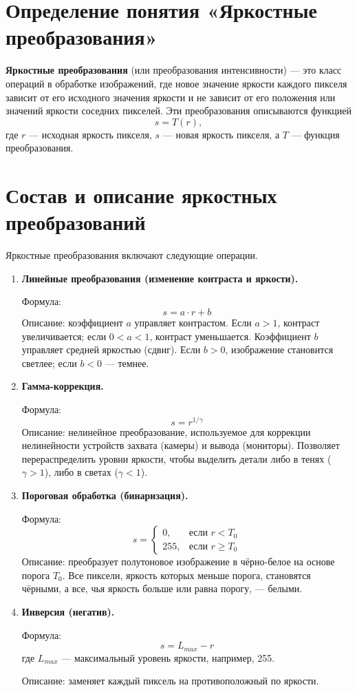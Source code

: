 \documentclass[12pt,a4paper]{article}
\begin{document}
\section{Определение понятия «Яркостные преобразования»}

\textbf{Яркостные преобразования} (или преобразования интенсивности) --- это класс операций в обработке изображений, где новое значение яркости каждого пикселя зависит от его исходного значения яркости и не зависит от его положения или значений яркости соседних пикселей. Эти преобразования описываются функцией
\[
s = T(r),
\]
где \(r\) --- исходная яркость пикселя, \(s\) --- новая яркость пикселя, а \(T\) --- функция преобразования.

\section{Состав и описание яркостных преобразований}

Яркостные преобразования включают следующие операции.

\begin{enumerate}
    \item \textbf{Линейные преобразования (изменение контраста и яркости).}

    Формула:
    \[
    s = a \cdot r + b
    \]
    Описание: коэффициент \(a\) управляет контрастом. Если \(a > 1\), контраст увеличивается; если \(0 < a < 1\), контраст уменьшается. Коэффициент \(b\) управляет средней яркостью (сдвиг). Если \(b > 0\), изображение становится светлее; если \(b < 0\) --- темнее.

    \item \textbf{Гамма-коррекция.}

    Формула:
    \[
    s = r^{1/\gamma}
    \]
    Описание: нелинейное преобразование, используемое для коррекции нелинейности устройств захвата (камеры) и вывода (мониторы). Позволяет перераспределить уровни яркости, чтобы выделить детали либо в тенях (\(\gamma > 1\)), либо в светах (\(\gamma < 1\)).

    \item \textbf{Пороговая обработка (бинаризация).}

    Формула:
    \[
    s = \begin{cases}
    0, & \text{если } r < T_0 \\
    255, & \text{если } r \ge T_0
    \end{cases}
    \]
    Описание: преобразует полутоновое изображение в чёрно-белое на основе порога \(T_0\). Все пиксели, яркость которых меньше порога, становятся чёрными, а все, чья яркость больше или равна порогу, --- белыми.

    \item \textbf{Инверсия (негатив).}

    Формула:
    \[
    s = L_{max} - r
    \]
    где \(L_{max}\) --- максимальный уровень яркости, например, 255.

    Описание: заменяет каждый пиксель на противоположный по яркости.
\end{enumerate}
\end{document}
